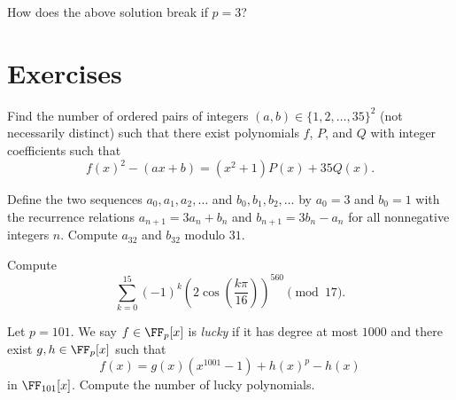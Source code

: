\documentclass[11pt]{scrartcl}
\begin{document}
How does the above solution break if $p = 3$?

\section{Exercises}

\begin{exercise}[HMMT 2015/A8]
    Find the number of ordered pairs of integers $(a,b) \in \{1,2,\dots,35\}^2$ (not necessarily distinct) such that there exist polynomials $f$, $P$, and $Q$ with integer coefficients such that
    \[f(x)^2 - (ax + b) = (x^2 + 1)P(x) + 35Q(x).\]
\end{exercise}

\begin{exercise}
    Define the two sequences $a_0,a_1,a_2,\dots$ and $b_0,b_1,b_2,\dots$ by $a_0 = 3$ and $b_0 = 1$ with the recurrence relations $a_{n + 1} = 3a_n + b_n$ and $b_{n + 1} = 3b_n - a_n$ for all nonnegative integers $n$. Compute $a_{32}$ and $b_{32}$ modulo $31$.
\end{exercise}

\begin{exercise}[BMT 2017/I20]
    Compute
    \[\sum_{k = 0}^{15}(-1)^k\left(2\cos\left( \frac{k\pi}{16} \right)\right)^{560} \pmod{17}.\]
\end{exercise}

\begin{exercise}[HMMT 2020/A10]
    Let $p = 101$. We say $f \in \FF_p[x]$ is \emph{lucky} if it has degree at most $1000$ and there exist $g,h \in \FF_p[x]$ such that
    \[f(x) = g(x)(x^{1001} - 1) + h(x)^p - h(x)\]
    in $\FF_{101}[x]$. Compute the number of lucky polynomials.
\end{exercise}
\end{document}
